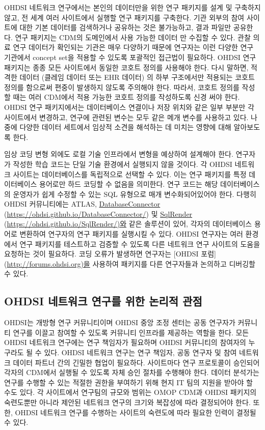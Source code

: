 \documentclass[11pt]{book}
\theoremstyle{definition}
\theoremstyle{definition}
\theoremstyle{definition}
\theoremstyle{remark}
\begin{document}
OHDSI 네트워크 연구에서는 본인의 데이터만을 위한 연구 패키지를 설계 및
구축하지 않고, 전 세계 여러 사이트에서 실행할 연구 패키지를 구축한다.
기관 외부의 참여 사이트에 대한 기본 데이터를 검색하거나 공유하는 것은
불가능하고, 결과 파일만 공유한다. 연구 패키지는 CDM의 도메인에서 사용
가능한 데이터 만 수집할 수 있다. 관찰 의료 연구 데이터가 확인되는 기관은
매우 다양하기 때문에 연구자는 이런 다양한 연구 기관에서 concept set을
적용할 수 있도록 포괄적인 접근법이 필요하다. OHDSI 연구 패키지는 종종
모든 사이트에서 동일한 코호트 정의를 사용해야 한다. 다시 말하면, 적격한
데이터 (클레임 데이터 또는 EHR 데이터) 의 하부 구조에서만 적용되는
코호트 정의를 함으로써 편중이 발생하지 않도록 주의해야 한다. 따라서,
코호트 정의를 작성할 때는 여러 CDM에서 적용 가능한 코호트 정의를
작성하도록 신경 써야 한다. OHDSI 연구 패키지에서는 데이터베이스 연결이나
저장 위치와 같은 일부 부분만 각 사이트에서 변경하고, 연구에 관련된
변수는 모두 같은 메개 변수를 사용하고 있다. 나중에 다양한 데이터
세트에서 임상적 소견을 해석하는 데 미치는 영향에 대해 알아보도록 한다.

임상 코딩 변형 외에도 로컬 기술 인프라에서 변형을 예상하여 설계해야
한다. 연구자가 작성한 학습 코드는 단일 기술 환경에서 실행되지 않을
것이다. 각 OHDSI 네트워크 사이트는 데이터베이스를 독립적으로 선택할 수
있다. 이는 연구 패키지를 특정 데이터베이스 용어로만 하드 코딩할 수
없음을 의미한다. 연구 코드는 해당 데이터베이스의 운영자가 쉽게 수정할 수
있는 SQL 유형으로 매개 변수화되어있어야 한다. 다행히 OHDSI 커뮤니티에는
ATLAS, \protect\hyperlink{DatabaseConnector}{DatabaseConnector}
(\url{https://ohdsi.github.io/DatabaseConnector/}) 및
\protect\hyperlink{SqlRender}{SqlRender}
(\url{https://ohdsi.github.io/SqlRender/)와} 같은 솔루션이 있어, 각자의
데이터베이스 용어로 변환하여 연구자의 연구 패키지를 실행시킬 수 있다.
OHDSI 연구자는 여러 환경에서 연구 패키지를 테스트하고 검증할 수 있도록
다른 네트워크 연구 사이트의 도움을 요청하는 것이 필요하다. 코딩 오류가
발생하면 연구자는 {[}OHDSI 포럼{]} (\url{http://forums.ohdsi.org)을}
사용하여 패키지를 다른 연구자들과 논의하고 디버깅할 수 있다.

\subsection{OHDSI 네트워크 연구를 위한 논리적 관점}\label{ohdsi-----}


OHDSI는 개방형 연구 커뮤니티이며 OHDSI 중앙 조정 센터는 공동 연구자가
커뮤니티 연구를 이끌고 참여할 수 있도록 커뮤니티 인프라를 제공하는
역할을 한다. 모든 OHDSI 네트워크 연구에는 연구 책임자가 필요하며 OHDSI
커뮤니티의 참여자의 누구라도 될 수 있다. OHDSI 네트워크 연구는 연구
책임자, 공동 연구자 및 참여 네트워크 데이터 파트너 간의 긴밀한 협업이
필요하다. 사이트마다 연구 프로토콜이 승인되어 각자의 CDM에서 실행될 수
있도록 자체 승인 절차를 수행해야 한다. 데이터 분석가는 연구를 수행할 수
있는 적절한 권한을 부여하기 위해 현지 IT 팀의 지원을 받아야 할 수도
있다. 각 사이트에서 연구팀의 규모와 범위는 OMOP CDM과 OHDSI 패키지의
숙련도뿐만 아니라 제안된 네트워크 연구의 크기와 복잡성에 따라 결정되어야
한다. 또한, OHDSI 네트워크 연구를 수행하는 사이트의 숙련도에 따라 필요한
인력이 결정될 수 있다.
\end{document}
